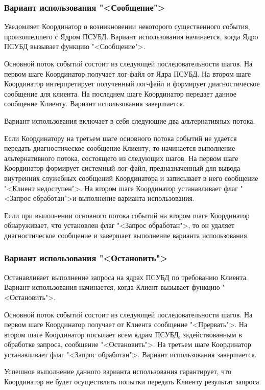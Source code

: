 \documentclass[11pt,oneside]{article}
\begin{document}
	\subsubsection{Вариант использования "<Сообщение">}
	\par Уведомляет Координатор о возникновении некоторого существенного события, произошедшего с Ядром ПСУБД. Вариант использования начинается, когда Ядро ПСУБД вызывает функцию "<Сообщение">.
	\par Основной поток событий состоит из следующей последовательности шагов. На первом шаге Координатор получает лог-файл от Ядра ПСУБД. На втором шаге Координатор интерпретирует полученный лог-файл и формирует диагностическое сообщение для клиента. На последнем шаге Координатор передает данное сообщение Клиенту. Вариант использования завершается.
	\par Вариант использования включает в себя следующие два альтернативных потока.
	\par Если Координатору на третьем шаге основного потока событий не удается передать диагностическое сообщение Клиенту, то начинается выполнение альтернативного потока, состоящего из следующих шагов. На первом шаге Координатор формирует системный лог-файл, предназначенный для вывода внутренних служебных сообщений Координатора и записывает в него сообщение "<Клиент недоступен">. На втором шаге Координатор устанавливает флаг "<Запрос обработан">и  выполнение варианта использования.
	\par Если при выполнении основного потока событий на втором шаге Координатор обнаруживает, что установлен флаг "<Запрос обработан">, то он удаляет диагностическое сообщение и завершает выполнение варианта использования.
	
	\subsubsection{Вариант использования "<Остановить">}
	\par Останавливает выполнение запроса на ядрах ПСУБД по требованию Клиента. Вариант использования начинается, когда Клиент вызывает функцию "<Остановить">.
	\par Основной поток событий состоит из следующей последовательности шагов. На первом шаге Координатор получает от Клиента сообщение "<Прервать">. На втором шаге Координатор посылает всем ядрам ПСУБД, задействованным в обработке запроса, сообщение "<Остановить">. На третьем шаге Координатор устанавливает флаг "<Запрос обработан">. Вариант использования завершается.
	\par Успешное выполнение данного варианта использования гарантирует, что Координатор не будет осуществлять попытки передать Клиенту результат запроса.
	
\end{document}
